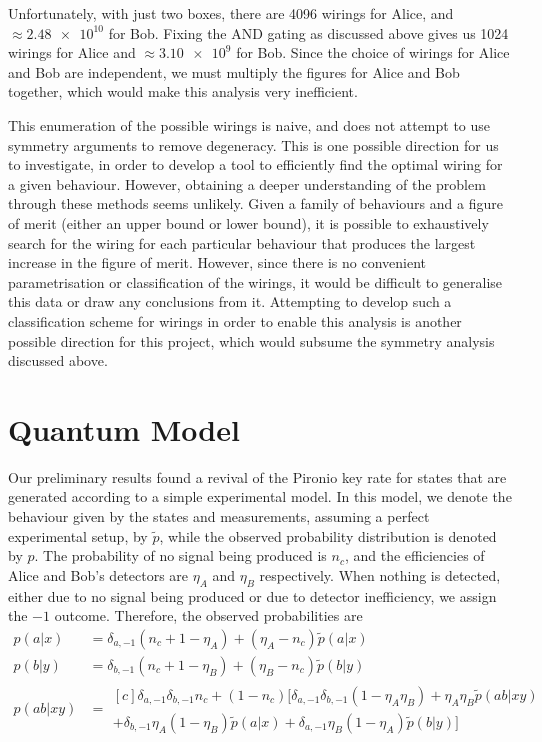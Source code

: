 \documentclass[10pt, a4paper]{article}
\newcommand{\?}{\mathrel{?}} %
\numberwithin{equation}{section} %
\theoremstyle{definition}
\theoremstyle{plain}
\theoremstyle{plain}
\begin{document}
    Unfortunately, with just two boxes, there are 4096 wirings for Alice, and \(\approx \num{2.48e10}\) for Bob. Fixing the AND gating as discussed above gives us 1024 wirings for Alice and \(\approx \num{3.10e9}\) for Bob. Since the choice of wirings for Alice and Bob are independent, we must multiply the figures for Alice and Bob together, which would make this analysis very inefficient.

    This enumeration of the possible wirings is naive, and does not attempt to use symmetry arguments to remove degeneracy. This is one possible direction for us to investigate, in order to develop a tool to efficiently find the optimal wiring for a given behaviour. However, obtaining a deeper understanding of the problem through these methods seems unlikely. Given a family of behaviours and a figure of merit (either an upper bound or lower bound), it is possible to exhaustively search for the wiring for each particular behaviour that produces the largest increase in the figure of merit. However, since there is no convenient parametrisation or classification of the wirings, it would be difficult to generalise this data or draw any conclusions from it. Attempting to develop such a classification scheme for wirings in order to enable this analysis is another possible direction for this project, which would subsume the symmetry analysis discussed above.

    \section{Quantum Model}

    Our preliminary results found a revival of the Pironio key rate for states that are generated according to a simple experimental model. In this model, we denote the behaviour given by the states and measurements, assuming a perfect experimental setup, by \(\tilde{p}\), while the observed probability distribution is denoted by \(p\). The probability of no signal being produced is \(n_c\), and the efficiencies of Alice and Bob's detectors are \(\eta_A\) and \(\eta_B\) respectively. When nothing is detected, either due to no signal being produced or due to detector inefficiency, we assign the \(-1\) outcome. Therefore, the observed probabilities are
    \begin{align*}
      p(a|x) &= \delta_{a,-1}(n_c + 1 - \eta_A) + (\eta_A - n_c)\tilde{p}(a|x) \\
      p(b|y) &= \delta_{b,-1}(n_c + 1 - \eta_B) + (\eta_B - n_c)\tilde{p}(b|y) \\
      p(ab|xy) &= \begin{aligned}[c] \delta_{a,-1}\delta_{b,-1}n_c + (1-n_c) [ \delta_{a,-1} \delta_{b,-1}(1-\eta_A\eta_B) + \eta_A\eta_B \tilde{p}(ab|xy) \\
        + \delta_{b,-1}\eta_A(1-\eta_B)\tilde{p}(a|x) + \delta_{a,-1}\eta_B(1-\eta_A)\tilde{p}(b|y) ] 
      \end{aligned}
    \end{align*}
\end{document}
